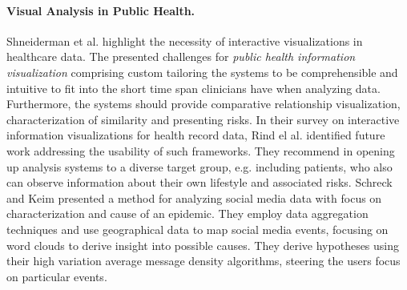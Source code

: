 \documentclass[journal]{style/vgtc} 			          %
\begin{document}
\paragraph{Visual Analysis in Public Health.}
Shneiderman et al. \cite{Shneiderman2013} highlight the necessity of interactive visualizations in healthcare data. %
The presented challenges for \emph{public health information visualization} comprising custom tailoring the systems to be comprehensible and intuitive to fit into the short time span clinicians have when analyzing data.
Furthermore, the systems should provide comparative relationship visualization, characterization of similarity and presenting risks.
In their survey on interactive information visualizations for health record data, Rind el al. \cite{Rind} identified future work addressing the usability of such frameworks.
They recommend in opening up analysis systems to a diverse target group, e.g. including patients, who also can observe information about their own lifestyle and associated risks.
Schreck and Keim \cite{Schreck} presented a method for analyzing social media data with focus on characterization and cause of an epidemic.
They employ data aggregation techniques and use geographical data to map social media events, focusing on word clouds to derive insight into possible causes.
They derive hypotheses using their high variation average message density algorithms, steering the users focus on particular events.
\end{document}
